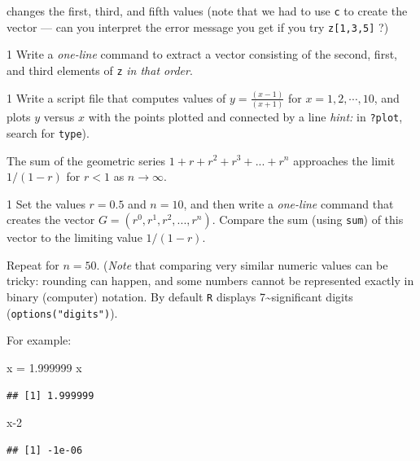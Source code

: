 \documentclass[11pt,]{article}
\newenvironment{Shaded}{\begin{snugshade}}{\end{snugshade}}
\newcommand{\DecValTok}[1]{\textcolor[rgb]{0.00,0.00,0.81}{#1}}
\newcommand{\FloatTok}[1]{\textcolor[rgb]{0.00,0.00,0.81}{#1}}
\newcommand{\NormalTok}[1]{#1}
\newcommand{\StringTok}[1]{\textcolor[rgb]{0.31,0.60,0.02}{#1}}
\let\BeginKnitrBlock\begin \let\EndKnitrBlock\end
\begin{document}
changes the first, third, and fifth values (note that we had to use \texttt{c} to create the vector --- can you interpret the error message you get if you
try \texttt{z{[}1,3,5{]}} ?)

\BeginKnitrBlock{exercisebox}{1}
Write a \emph{one-line} command to extract a vector consisting of the second, first, and third elements of \texttt{z} \emph{in that order}.
\EndKnitrBlock{exercisebox}

\BeginKnitrBlock{exercisebox}{1}
Write a script file that computes values of
\(y=\frac{(x-1)}{(x+1)}\) for \(x=1,2,\cdots,10\), and plots \(y\) versus \(x\)
with the points plotted and connected by a line
\emph{hint:} in \texttt{?plot}, search for \texttt{type}).
\EndKnitrBlock{exercisebox}

The sum of the geometric series \(1 + r + r^2 + r^3 + ... + r^n\) approaches the limit \(1/(1-r)\) for \(r < 1\) as \(n \rightarrow \infty\).

\BeginKnitrBlock{exercisebox}{1}
Set the values \(r=0.5\) and \(n=10\), and then write a \emph{one-line} command that creates the vector \(G = (r^0,r^1,r^2,...,r^n)\). Compare the sum (using \texttt{sum}) of this vector to the limiting value \(1/(1-r)\).

Repeat for \(n=50\). (\emph{Note} that comparing very similar numeric values can be tricky: rounding can happen, and some numbers cannot be represented exactly in binary (computer) notation. By default \texttt{R} displays 7\textasciitilde{}significant digits (\texttt{options("digits")}).
\EndKnitrBlock{exercisebox}

For example:

\begin{Shaded}
\begin{Highlighting}[]
\NormalTok{x =}\StringTok{ }\FloatTok{1.999999}
\NormalTok{x}
\end{Highlighting}
\end{Shaded}

\begin{verbatim}
## [1] 1.999999
\end{verbatim}

\begin{Shaded}
\begin{Highlighting}[]
\NormalTok{x}\DecValTok{-2}
\end{Highlighting}
\end{Shaded}

\begin{verbatim}
## [1] -1e-06
\end{verbatim}
\end{document}
